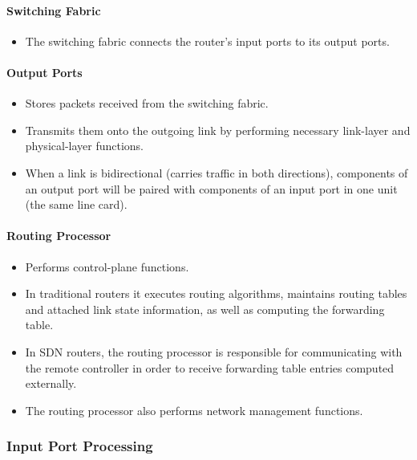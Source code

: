 \documentclass{article}
\begin{document}
\paragraph{Switching Fabric}

\begin{itemize}
    \item The switching fabric connects the router's input ports to its output ports.
\end{itemize}

\paragraph{Output Ports}

\begin{itemize}
    \item Stores packets received from the switching fabric.
    \item Transmits them onto the outgoing link by performing necessary link-layer and physical-layer functions.
    \item When a link is bidirectional (carries traffic in both directions), components of an output port will be paired with components of an input port in one unit (the same line card).
\end{itemize}

\paragraph{Routing Processor}

\begin{itemize}
    \item Performs control-plane functions.
    \item In traditional routers it executes routing algorithms, maintains routing tables and attached link state information, as well as computing the forwarding table.
    \item In SDN routers, the routing processor is responsible for communicating with the remote controller in order to receive forwarding table entries computed externally.
    \item The routing processor also performs network management functions.
\end{itemize}

\subsubsection{Input Port Processing}
\end{document}
